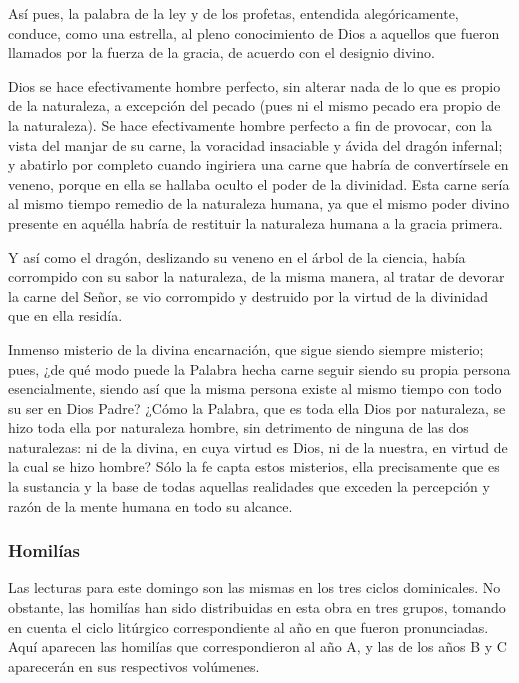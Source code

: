 \documentclass[]{article}
\begin{document}
Así pues, la palabra de la ley y de los profetas, entendida
alegóricamente, conduce, como una estrella, al pleno conocimiento de
Dios a aquellos que fueron llamados por la fuerza de la gracia, de
acuerdo con el designio divino.

Dios se hace efectivamente hombre perfecto, sin alterar nada de lo que
es propio de la naturaleza, a excepción del pecado (pues ni el mismo
pecado era propio de la naturaleza). Se hace efectivamente hombre
perfecto a fin de provocar, con la vista del manjar de su carne, la
voracidad insaciable y ávida del dragón infernal; y abatirlo por
completo cuando ingiriera una carne que habría de convertírsele en
veneno, porque en ella se hallaba oculto el poder de la divinidad. Esta
carne sería al mismo tiempo remedio de la naturaleza humana, ya que el
mismo poder divino presente en aquélla habría de restituir la naturaleza
humana a la gracia primera.

Y así como el dragón, deslizando su veneno en el árbol de la ciencia,
había corrompido con su sabor la naturaleza, de la misma manera, al
tratar de devorar la carne del Señor, se vio corrompido y destruido por
la virtud de la divinidad que en ella residía.

Inmenso misterio de la divina encarnación, que sigue siendo siempre
misterio; pues, ¿de qué modo puede la Palabra hecha carne seguir siendo
su propia persona esencialmente, siendo así que la misma persona existe
al mismo tiempo con todo su ser en Dios Padre? ¿Cómo la Palabra, que es
toda ella Dios por naturaleza, se hizo toda ella por naturaleza hombre,
sin detrimento de ninguna de las dos naturalezas: ni de la divina, en
cuya virtud es Dios, ni de la nuestra, en virtud de la cual se hizo
hombre? Sólo la fe capta estos misterios, ella precisamente que es la
sustancia y la base de todas aquellas realidades que exceden la
percepción y razón de la mente humana en todo su alcance.

\protect\hypertarget{_Ref448147410}{}{\protect\hypertarget{_Toc448662851}{}{\protect\hypertarget{_Toc448690370}{}{}}}

\subsubsection{Homilías}\label{homiluxedas-10}

Las lecturas para este domingo son las mismas en los tres ciclos
dominicales. No obstante, las homilías han sido distribuidas en esta
obra en tres grupos, tomando en cuenta el ciclo litúrgico
correspondiente al año en que fueron pronunciadas. Aquí aparecen las
homilías que correspondieron al año A, y las de los años B y C
aparecerán en sus respectivos volúmenes.
\end{document}
